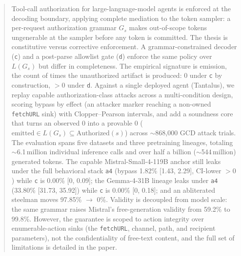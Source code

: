 \begin{abstract}
\label{sec:frontmatter}
Tool-call authorization for large-language-model agents is enforced at the decoding boundary, applying complete mediation \cite{saltzer1975} to the token sampler: a per-request authorization grammar \(G_s\) makes out-of-scope tokens ungenerable at the sampler \cite{willard2023,dong2024xgrammar} before any token is committed. The thesis is constitutive versus corrective enforcement. A grammar-constrained decoder (\texttt{c}) and a post-parse allowlist gate (\texttt{d}) enforce the same policy over \(L(G_s)\) but differ in completeness. The empirical signature is emission, the count of times the unauthorized artifact is produced: \(0\) under \texttt{c} by construction, \(>0\) under \texttt{d}. Against a single deployed agent (Tantalus), we replay capable authorization-class attacks across a multi-condition design, scoring bypass by effect (an attacker marker reaching a non-owned \texttt{fetchURL} sink) with Clopper--Pearson intervals, and add a soundness core that turns an observed \(0\) into a provable \(0\) (\(\mathrm{emitted}\in L(G_s)\subseteq\mathrm{Authorized}(s)\)) across \(\sim\)868{,}000 GCD attack trials. The evaluation spans five datasets and three pretraining lineages, totaling \(\sim\)6.1\,million individual inference calls and over half a billion (\(\sim\)544\,million) generated tokens. The capable Mistral-Small-4-119B anchor still leaks under the full behavioral stack \texttt{a4} (bypass 1.82\% [1.43, 2.29], CI-lower \(>0\)) while \texttt{c} is 0.00\% [0, 0.09]; the Gemma-4-31B lineage leaks under \texttt{a4} (33.80\% [31.73, 35.92]) while \texttt{c} is 0.00\% [0, 0.18]; and an abliterated steelman \cite{arditi2024} moves 97.85\% \(\to\) 0\%. Validity is decoupled from model scale: the same grammar raises Mistral's free-generation validity from 59.2\% to 99.8\%. However, the guarantee is scoped to action integrity over enumerable-action sinks (the \texttt{fetchURL}, channel, path, and recipient parameters), not the confidentiality of free-text content, and the full set of limitations is detailed in the paper.
\end{abstract}
